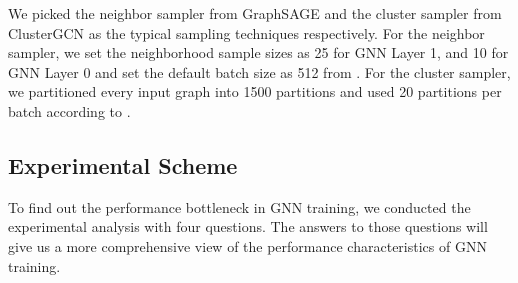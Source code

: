 We picked the neighbor sampler from GraphSAGE \cite{hamilton2017_graphsage} and the cluster sampler from ClusterGCN \cite{chiang2019_cluster_gcn} as the typical sampling techniques respectively.
For the neighbor sampler, we set the neighborhood sample sizes as 25 for GNN Layer 1, and 10 for GNN Layer 0 and set the default batch size as 512 from \cite{hamilton2017_graphsage}.
For the cluster sampler, we partitioned every input graph into 1500 partitions and used 20 partitions per batch according to \cite{chiang2019_cluster_gcn}.

\subsection{Experimental Scheme}
\label{sec:experimental_scheme}

To find out the performance bottleneck in GNN training, we conducted the experimental analysis with four questions.
The answers to those questions will give us a more comprehensive view of the performance characteristics of GNN training.

